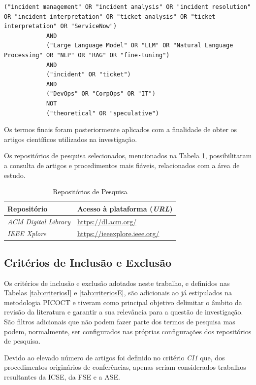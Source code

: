 		\begin{lstlisting}[caption={Termos de Pesquisa},label={cod:palavrasChave}]
			("incident management" OR "incident analysis" OR "incident resolution" OR "incident interpretation" OR "ticket analysis" OR "ticket interpretation" OR "ServiceNow")
			AND
			("Large Language Model" OR "LLM" OR "Natural Language Processing" OR "NLP" OR "RAG" OR "fine-tuning")
			AND
			("incident" OR "ticket")
			AND
			("DevOps" OR "CorpOps" OR "IT")
			NOT
			("theoretical" OR "speculative")
		\end{lstlisting}
		
		Os termos finais foram posteriormente aplicados com a finalidade de obter os artigos científicos utilizados na investigação.
		
		Os repositórios de pesquisa selecionados, mencionados na Tabela \ref{tab:repositorios}, possibilitaram a consulta de artigos e procedimentos mais fiáveis, relacionados com a área de estudo.
		
		\begin{table}[H]
			\centering
			\begin{tabular}{l l}
				\hline
				\textbf{Repositório} & \textbf{Acesso à plataforma (\textit{URL})} \\
				\hline
				\textit{ACM Digital Library} & \url{https://dl.acm.org/} \\
				\textit{IEEE Xplore} & \url{https://ieeexplore.ieee.org/} \\
				\hline
			\end{tabular}
			\caption[Repositórios de Pesquisa]{Repositórios de Pesquisa}
			\label{tab:repositorios}
		\end{table}
	
	
	\subsection{Critérios de Inclusão e Exclusão}
		Os critérios de inclusão e exclusão adotados neste trabalho, e definidos nas Tabelas \ref{tab:criteriosI} e \ref{tab:criteriosE}, são adicionais ao já estipulados na metodologia \gls{PICOCT} e tiveram como principal objetivo delimitar o âmbito da revisão da literatura e garantir a sua relevância para a questão de investigação. São filtros adicionais que não podem fazer parte dos termos de pesquisa mas podem, normalmente, ser configurados nas próprias configurações dos repositórios de pesquisa.
		
		Devido ao elevado número de artigos foi definido no critério \textit{CI1} que, dos procedimentos originários de conferências, apenas seriam considerados trabalhos resultantes da \gls{ICSE}, da \gls{FSE} e a \gls{ASE}.
		
